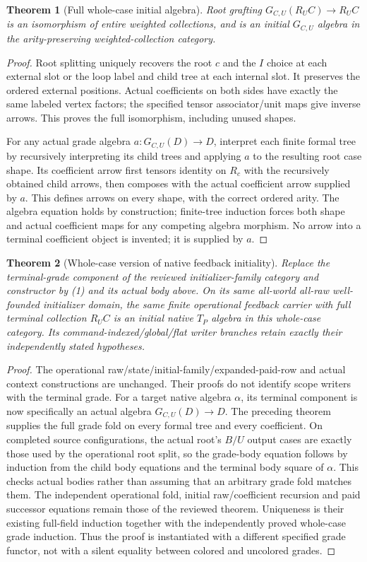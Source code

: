 \documentclass[11pt]{article}
\newtheorem{theorem}{Theorem}\newtheorem{proposition}[theorem]{Proposition}
\begin{document}
\begin{theorem}[Full whole-case initial algebra]
Root grafting $G_{C,U}(R_UC)\to R_UC$ is an isomorphism of entire weighted collections, and is an initial $G_{C,U}$ algebra in the arity-preserving weighted-collection category.
\end{theorem}
\begin{proof}
Root splitting uniquely recovers the root $c$ and the $I$ choice at each external slot or the loop label and child tree at each internal slot. It preserves the ordered external positions. Actual coefficients on both sides have exactly the same labeled vertex factors; the specified tensor associator/unit maps give inverse arrows. This proves the full isomorphism, including unused shapes.

For any actual grade algebra $a:G_{C,U}(D)\to D$, interpret each finite formal tree by recursively interpreting its child trees and applying $a$ to the resulting root case shape. Its coefficient arrow first tensors identity on $R_c$ with the recursively obtained child arrows, then composes with the actual coefficient arrow supplied by $a$. This defines arrows on every shape, with the correct ordered arity. The algebra equation holds by construction; finite-tree induction forces both shape and actual coefficient maps for any competing algebra morphism. No arrow into a terminal coefficient object is invented; it is supplied by $a$.\end{proof}

\begin{theorem}[Whole-case version of native feedback initiality]
Replace the terminal-grade component of the reviewed initializer-family category and constructor by (1) and its actual body above. On its same all-world all-raw well-founded initializer domain, the same finite operational feedback carrier with full terminal collection $R_UC$ is an initial native $T_P$ algebra in this whole-case category. Its command-indexed/global/flat writer branches retain exactly their independently stated hypotheses.
\end{theorem}
\begin{proof}
The operational raw/state/initial-family/expanded-paid-row and actual context constructions are unchanged. Their proofs do not identify scope writers with the terminal grade. For a target native algebra $\alpha$, its terminal component is now specifically an actual algebra $G_{C,U}(D)\to D$. The preceding theorem supplies the full grade fold on every formal tree and every coefficient. On completed source configurations, the actual root's $B/U$ output cases are exactly those used by the operational root split, so the grade-body equation follows by induction from the child body equations and the terminal body square of $\alpha$. This checks actual bodies rather than assuming that an arbitrary grade fold matches them. The independent operational fold, initial raw/coefficient recursion and paid successor equations remain those of the reviewed theorem. Uniqueness is their existing full-field induction together with the independently proved whole-case grade induction. Thus the proof is instantiated with a different specified grade functor, not with a silent equality between colored and uncolored grades.\end{proof}
\end{document}
